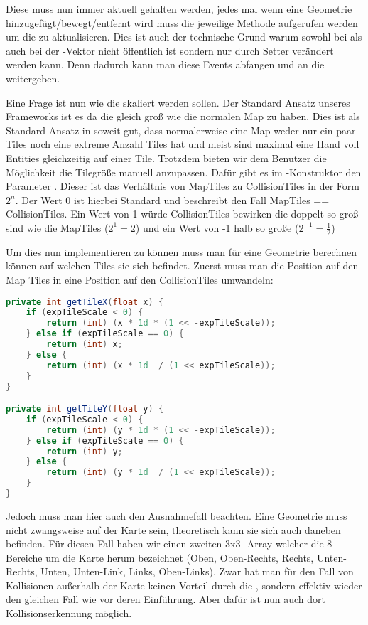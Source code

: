 Diese  muss nun immer aktuell gehalten werden, jedes mal wenn eine Geometrie hinzugefügt/bewegt/entfernt wird muss die jeweilige Methode aufgerufen werden um die  zu aktualisieren. Dies ist auch der technische Grund warum sowohl bei  als auch bei  der -Vektor nicht öffentlich ist sondern nur durch Setter verändert werden kann. Denn dadurch kann man diese Events abfangen und an die  weitergeben.

Eine Frage ist nun wie die  skaliert werden sollen. Der Standard Ansatz unseres Frameworks ist es da die  gleich groß wie die normalen Map  zu haben.
Dies ist als Standard Ansatz in soweit gut, dass normalerweise eine Map weder nur ein paar Tiles noch eine extreme Anzahl Tiles hat und meist sind maximal eine Hand voll Entities gleichzeitig auf einer Tile.
Trotzdem bieten wir dem Benutzer die Möglichkeit die Tilegröße manuell anzupassen.
Dafür gibt es im -Konstruktor den Parameter .
Dieser ist das Verhältnis von MapTiles zu CollisionTiles in der Form $ 2^n $.
Der Wert 0 ist hierbei Standard und beschreibt den Fall MapTiles == CollisionTiles.
Ein Wert von 1 würde CollisionTiles bewirken die doppelt so groß sind wie die MapTiles ($2^1 = 2$) und ein Wert von -1 halb so große ($2^{-1} = \frac{1}{2}$)

Um dies nun implementieren zu können muss man für eine Geometrie berechnen können auf welchen Tiles sie sich befindet.
Zuerst muss man die Position auf den Map Tiles in eine Position auf den CollisionTiles umwandeln:

\doinline
\begin{lstlisting}[caption=Berechnen der CollisionMap-Position aus der Tile-Position, title=\hspace{0 pt}, language=java]
private int getTileX(float x) {
	if (expTileScale < 0) {
		return (int) (x * 1d * (1 << -expTileScale));		
	} else if (expTileScale == 0) {
		return (int) x;
	} else {
		return (int) (x * 1d  / (1 << expTileScale));
	}
}

private int getTileY(float y) {
	if (expTileScale < 0) {
		return (int) (y * 1d * (1 << -expTileScale));		
	} else if (expTileScale == 0) {
		return (int) y;
	} else {
		return (int) (y * 1d  / (1 << expTileScale));
	}
}
\end{lstlisting}

Jedoch muss man hier auch den Ausnahmefall beachten. Eine Geometrie muss nicht zwangsweise auf der Karte sein, theoretisch kann sie sich auch daneben befinden.
Für diesen Fall haben wir einen zweiten 3x3 -Array welcher die 8 Bereiche um die Karte herum bezeichnet (Oben, Oben-Rechts, Rechts, Unten-Rechts, Unten, Unten-Link, Links, Oben-Links). Zwar hat man für den Fall von Kollisionen außerhalb der Karte keinen Vorteil durch die , sondern effektiv wieder den gleichen Fall wie vor deren Einführung. Aber dafür ist nun auch dort Kollisionserkennung möglich.

